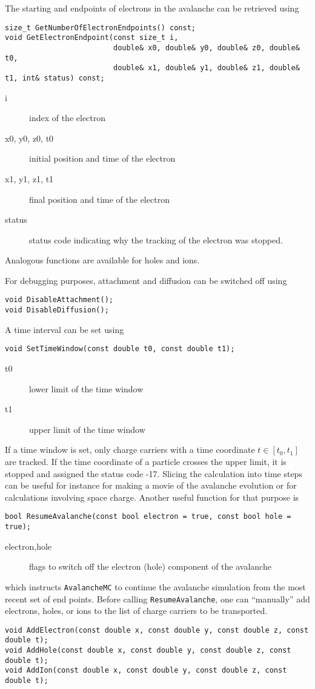 The starting and endpoints of electrons in the avalanche can be 
retrieved using
\begin{lstlisting}
size_t GetNumberOfElectronEndpoints() const;
void GetElectronEndpoint(const size_t i, 
                         double& x0, double& y0, double& z0, double& t0,
                         double& x1, double& y1, double& z1, double& t1, int& status) const;
\end{lstlisting}
\begin{description}
  \item[i] index of the electron
  \item[x0, y0, z0, t0] initial position and time of the electron
  \item[x1, y1, z1, t1] final position and time of the electron
  \item[status] status code indicating why the tracking of the electron was stopped.  
\end{description}
Analogous functions are available for holes and ions.

For debugging purposes, attachment and diffusion can be switched off using
\begin{lstlisting}
void DisableAttachment();
void DisableDiffusion();
\end{lstlisting}

A time interval can be set using
\begin{lstlisting}
void SetTimeWindow(const double t0, const double t1);
\end{lstlisting}
\begin{description}
  \item[t0] lower limit of the time window
  \item[t1] upper limit of the time window 
\end{description}
If a time window is set, 
only charge carriers with a time coordinate \(t \in \left[t_{0}, t_{1}\right]\) 
are tracked. If the time coordinate of a particle crosses the upper limit, 
it is stopped and assigned the status code -17.
Slicing the calculation into time steps can be useful for instance 
for making a movie of the avalanche evolution 
or for calculations involving space charge. 
Another useful function for that purpose is
\begin{lstlisting}
bool ResumeAvalanche(const bool electron = true, const bool hole = true);
\end{lstlisting}
\begin{description}
  \item[electron,hole] flags to switch off the electron (hole) component of the avalanche
\end{description}
which instructs \texttt{AvalancheMC} to continue the avalanche simulation 
from the most recent set of end points.
Before calling \texttt{ResumeAvalanche}, one can ``manually'' add 
electrons, holes, or ions to the list of charge carriers to be transported. 
\begin{lstlisting}
void AddElectron(const double x, const double y, const double z, const double t); 
void AddHole(const double x, const double y, const double z, const double t); 
void AddIon(const double x, const double y, const double z, const double t); 
\end{lstlisting} 

